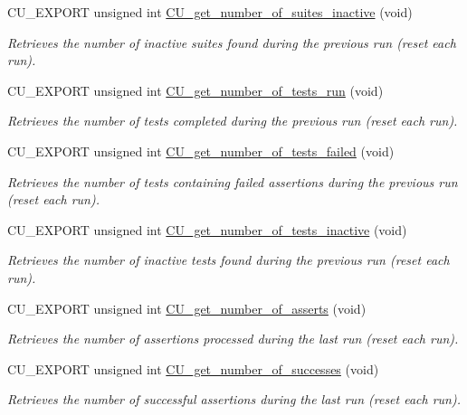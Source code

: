\begin{DoxyCompactItemize}
C\-U\-\_\-\-E\-X\-P\-O\-R\-T unsigned int \hyperlink{group__Framework_gad186c9dd5c2140cef36534d227f4c78b}{C\-U\-\_\-get\-\_\-number\-\_\-of\-\_\-suites\-\_\-inactive} (void)
\begin{DoxyCompactList}\small\item\em Retrieves the number of inactive suites found during the previous run (reset each run). \end{DoxyCompactList}\item 
C\-U\-\_\-\-E\-X\-P\-O\-R\-T unsigned int \hyperlink{group__Framework_gac65efb0052e7dce29d1d7ad08cecdbce}{C\-U\-\_\-get\-\_\-number\-\_\-of\-\_\-tests\-\_\-run} (void)
\begin{DoxyCompactList}\small\item\em Retrieves the number of tests completed during the previous run (reset each run). \end{DoxyCompactList}\item 
C\-U\-\_\-\-E\-X\-P\-O\-R\-T unsigned int \hyperlink{group__Framework_ga4025c263b716768adf42705a8df34f1c}{C\-U\-\_\-get\-\_\-number\-\_\-of\-\_\-tests\-\_\-failed} (void)
\begin{DoxyCompactList}\small\item\em Retrieves the number of tests containing failed assertions during the previous run (reset each run). \end{DoxyCompactList}\item 
C\-U\-\_\-\-E\-X\-P\-O\-R\-T unsigned int \hyperlink{group__Framework_ga981ba8759b754eb07e2999e380610ad9}{C\-U\-\_\-get\-\_\-number\-\_\-of\-\_\-tests\-\_\-inactive} (void)
\begin{DoxyCompactList}\small\item\em Retrieves the number of inactive tests found during the previous run (reset each run). \end{DoxyCompactList}\item 
C\-U\-\_\-\-E\-X\-P\-O\-R\-T unsigned int \hyperlink{group__Framework_ga2ac4bd2bd80e94b1288a472b12ee9931}{C\-U\-\_\-get\-\_\-number\-\_\-of\-\_\-asserts} (void)
\begin{DoxyCompactList}\small\item\em Retrieves the number of assertions processed during the last run (reset each run). \end{DoxyCompactList}\item 
C\-U\-\_\-\-E\-X\-P\-O\-R\-T unsigned int \hyperlink{group__Framework_ga56d72dc7bd4c976194c71f144bda75bf}{C\-U\-\_\-get\-\_\-number\-\_\-of\-\_\-successes} (void)
\begin{DoxyCompactList}\small\item\em Retrieves the number of successful assertions during the last run (reset each run). \end{DoxyCompactList}\item 

\end{DoxyCompactItemize}
